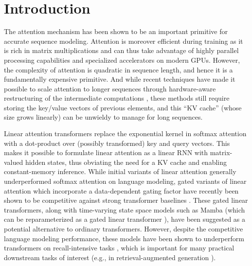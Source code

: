 \vspace{-4mm}
\section{Introduction}
\vspace{-2mm}
The attention mechanism \cite{bahdanau2014neural,vaswani_attention_2017} has been shown to be an important primitive for accurate sequence modeling. Attention is moreover efficient during training as it is rich in matrix multiplications and  can thus take advantage of highly parallel processing capabilities and specialized accelerators on modern GPUs. However, the complexity of attention is quadratic in sequence length, and hence it is a fundamentally expensive primitive. And while recent techniques  have made it possible to scale attention to longer sequences through hardware-aware restructuring of the intermediate computations \cite{dao_flashattention_2022,dao_flashattention-2_2023,liu_ring_2023,brandon_striped_2023}, these methods still  require storing the key/value vectors of previous elements, and this  ``KV cache'' (whose size grows linearly) can  be unwieldy to manage for long sequences. 


Linear attention transformers \cite{katharopoulos_transformers_2020} replace the exponential kernel in softmax attention with a dot-product over (possibly transformed) key and query vectors. This   makes it possible to formulate linear attention as a linear RNN with matrix-valued hidden states, thus obviating the need for a KV cache and enabling constant-memory inference. While initial variants of linear attention generally underperformed softmax attention    on language modeling,  gated variants of linear attention which incorporate a data-dependent gating factor have  recently been shown to be competitive against strong transformer baselines \cite{yang_gated_2023,qin_hgrn2_2024,beck2024xlstm, peng_eagle_2024}. 
These gated linear transformers, along with time-varying state space models such as Mamba \cite{gu_mamba_2023,mamba2} (which can be reparameterized as a gated linear transformer \cite{yang_gated_2023}), have been suggested as a  potential alternative to ordinary transformers.
However, despite the competitive language modeling performance, these models have been shown to underperform transformers on recall-intensive tasks \cite{arora_simple_2024, arora-2024-jrt}, which is important for many practical downstream tasks of interest (e.g., in retrieval-augmented generation \cite{lewis_retrieval-augmented_2021}). 



